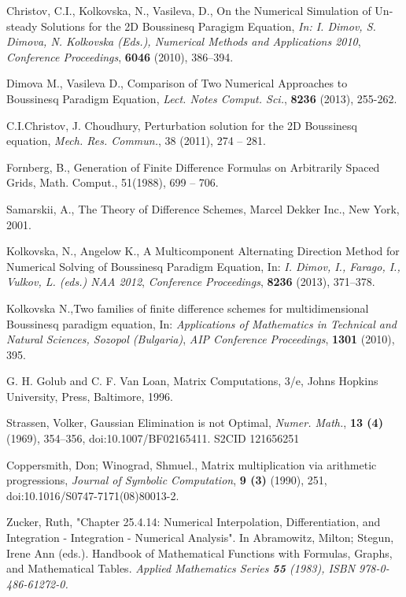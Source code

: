\documentclass{article}
\begin{document}
\begin{thebibliography}{99}
 Christov, C.I., Kolkovska, N., Vasileva, D., On the Numerical Simulation of Un-
steady Solutions for the 2D Boussinesq Paragigm Equation,
{\it In: I. Dimov, S. Dimova, N. Kolkovska (Eds.), Numerical Methods and Applications 2010},
\emph{Conference Proceedings}, \textbf{6046} (2010), 386–394.

 Dimova M., Vasileva D., Comparison of Two Numerical Approaches to Boussinesq Paradigm Equation, 
{\it Lect. Notes Comput. Sci.}, \textbf{8236} (2013), 255-262.

C.I.Christov, J. Choudhury, Perturbation solution  for the 2D Boussinesq equation,       
{\it Mech. Res. Commun.}, 38 (2011),  274 -- 281.

Fornberg, B., Generation of Finite Difference Formulas on Arbitrarily Spaced Grids, 
Math. Comput., 51(1988),  699 -- 706.

 Samarskii, A., The Theory of Difference Schemes, Marcel Dekker Inc., New York, 2001.

 Kolkovska, N., Angelow K., A Multicomponent Alternating Direction Method for Numerical Solving of Boussinesq Paradigm Equation,
In: {\it  I. Dimov, I., Farago, I., Vulkov, L. (eds.) NAA 2012},
\emph{Conference Proceedings}, \textbf{8236} (2013), 371–378.

 Kolkovska N.,Two families of finite difference schemes for multidimensional Boussinesq paradigm equation, In:
{\it Applications of Mathematics in Technical and Natural Sciences,  Sozopol (Bulgaria)},
\emph{AIP Conference Proceedings}, \textbf{1301} (2010), 395.

 G. H. Golub and C. F. Van Loan, Matrix Computations, 3/e, Johns Hopkins University, Press, Baltimore, 1996.

Strassen, Volker, Gaussian Elimination is not Optimal,
{\it Numer. Math.}, \textbf{13 (4)} (1969), 354–356, doi:10.1007/BF02165411. S2CID 121656251

 Coppersmith, Don; Winograd, Shmuel., Matrix multiplication via arithmetic progressions,
{\it  Journal of Symbolic Computation}, \textbf{9 (3)} (1990), 251, doi:10.1016/S0747-7171(08)80013-2.

Zucker, Ruth, "Chapter 25.4.14: Numerical Interpolation, Differentiation, and Integration - Integration - Numerical Analysis". In Abramowitz, Milton; Stegun, Irene Ann (eds.). Handbook of Mathematical Functions with Formulas, Graphs, and Mathematical Tables. 
\it{Applied Mathematics Series} \textbf{55}  (1983), ISBN 978-0-486-61272-0.


\end{thebibliography}
\end{document}
